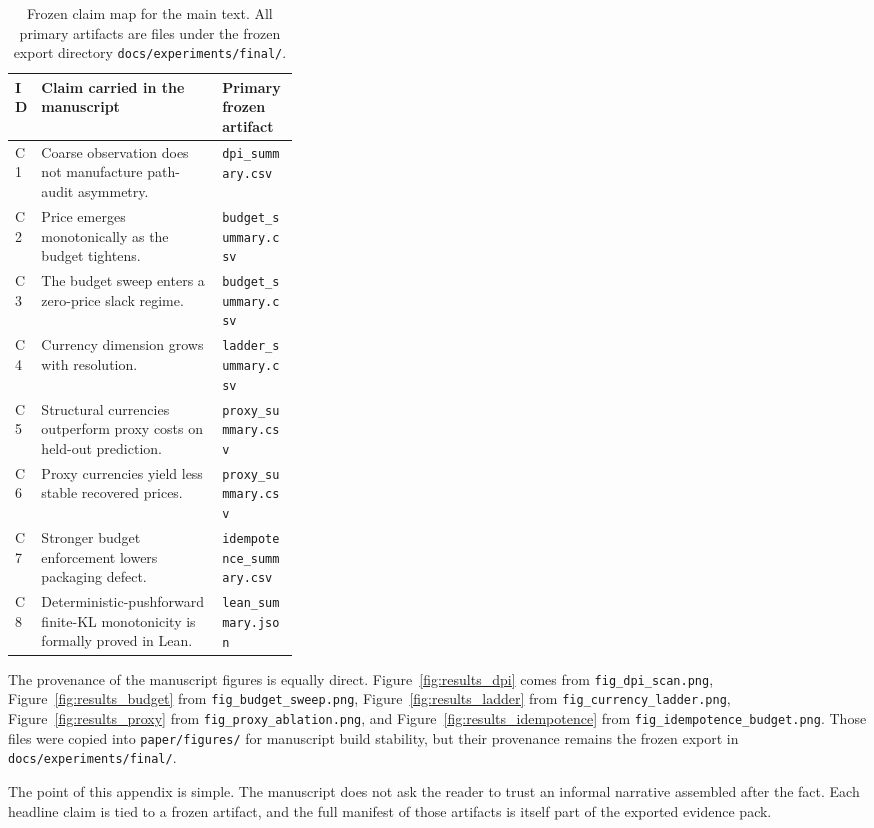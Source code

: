 \documentclass[11pt,a4paper]{article}
\DeclareRobustCommand{\code}[1]{{\begingroup\urlstyle{tt}\nolinkurl{#1}\endgroup}}
\begin{document}
\begin{table}[tbp]
    \centering
    \small
    \setlength{\tabcolsep}{6pt}
    \renewcommand{\arraystretch}{1.1}
    \caption{Frozen claim map for the main text. All primary artifacts are files under the frozen export directory {\small\texttt{docs/experiments/final/}}.}
    \label{tab:claimledger}
    \begin{tabularx}{\linewidth}{L{0.06\linewidth}Y L{0.27\linewidth}}
        \toprule
        ID & Claim carried in the manuscript & Primary frozen artifact \\
        \midrule
        C1 & Coarse observation does not manufacture path-audit asymmetry. & \code{dpi_summary.csv} \\
        C2 & Price emerges monotonically as the budget tightens. & \code{budget_summary.csv} \\
        C3 & The budget sweep enters a zero-price slack regime. & \code{budget_summary.csv} \\
        C4 & Currency dimension grows with resolution. & \code{ladder_summary.csv} \\
        C5 & Structural currencies outperform proxy costs on held-out prediction. & \code{proxy_summary.csv} \\
        C6 & Proxy currencies yield less stable recovered prices. & \code{proxy_summary.csv} \\
        C7 & Stronger budget enforcement lowers packaging defect. & \code{idempotence_summary.csv} \\
        C8 & Deterministic-pushforward finite-KL monotonicity is formally proved in Lean. & \code{lean_summary.json} \\
        \bottomrule
    \end{tabularx}
\end{table}

The provenance of the manuscript figures is equally direct. Figure~\ref{fig:results_dpi} comes from \code{fig_dpi_scan.png}, Figure~\ref{fig:results_budget} from \code{fig_budget_sweep.png}, Figure~\ref{fig:results_ladder} from \code{fig_currency_ladder.png}, Figure~\ref{fig:results_proxy} from \code{fig_proxy_ablation.png}, and Figure~\ref{fig:results_idempotence} from \code{fig_idempotence_budget.png}. Those files were copied into \code{paper/figures/} for manuscript build stability, but their provenance remains the frozen export in \code{docs/experiments/final/}.

The point of this appendix is simple. The manuscript does not ask the reader to trust an informal narrative assembled after the fact. Each headline claim is tied to a frozen artifact, and the full manifest of those artifacts is itself part of the exported evidence pack.
\end{document}
